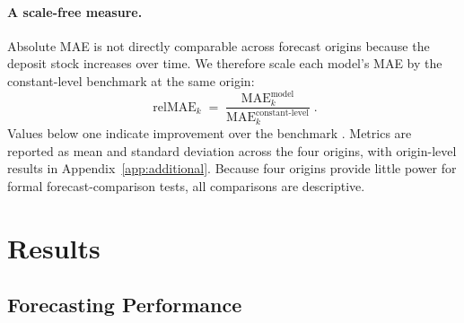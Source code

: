 \documentclass[11pt,a4paper]{article}
\begin{document}
\paragraph{A scale-free measure.}
Absolute MAE is not directly comparable across forecast origins because the
deposit stock increases over time. We therefore scale each model's MAE by the
constant-level benchmark at the same origin:
\begin{equation}
    \operatorname{relMAE}_k
    =
    \frac{\operatorname{MAE}_k^{\text{model}}}
         {\operatorname{MAE}_k^{\text{constant-level}}}.
    \label{eq:relmae}
\end{equation}
Values below one indicate improvement over the benchmark
\citep{hyndman2006mase}. Metrics are reported as mean and standard deviation
across the four origins, with origin-level results in
Appendix~\ref{app:additional}. Because four origins provide little power for
formal forecast-comparison tests, all comparisons are descriptive.

\section{Results}
\label{sec:results}

\subsection{Forecasting Performance}
\end{document}
